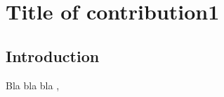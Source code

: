 \author[Lecturer1]{Lecturer1\\ Address}

\chapter{Title of contribution1}

\section{Introduction}

Bla bla bla \citep{lecturer1:abreu10}, \citep{lecturer1:abreu100}



